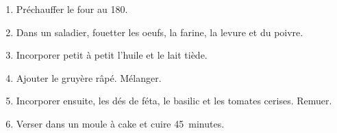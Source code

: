 \serves{}
\makes{}

\begin{ingredients}
\end{ingredients}

\begin{recipe}
  \begin{enumerate}

  \item Pr\'echauffer le four au 180\degreeC.

  \item Dans un saladier, fouetter les oeufs, la farine, la levure et
    du poivre.

  \item Incorporer petit \`a petit l'huile et le lait ti\`ede.

  \item Ajouter le gruy\`ere r\^ap\'e. M\'elanger.

  \item Incorporer ensuite, les d\'es de f\'eta, le basilic et les tomates
    cerises.  Remuer.

  \item Verser dans un moule \`a cake et cuire 45~minutes.


  \end{enumerate}
\end{recipe}
